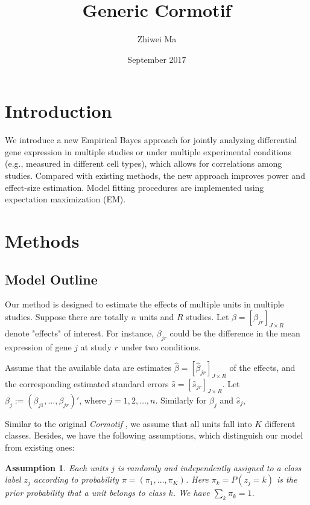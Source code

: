 \documentclass[11pt]{article}
\title{Generic Cormotif}
\author{Zhiwei Ma}
\date{September 2017}
\newtheorem{assumption}{Assumption}
\begin{document}
\maketitle

\section{Introduction}

We introduce a new Empirical Bayes approach for jointly analyzing differential gene expression in multiple studies or under multiple experimental conditions (e.g., measured in different cell types), which allows for correlations among studies. Compared with existing methods, the new approach improves power and effect-size estimation. Model fitting procedures are implemented using expectation maximization (EM).
\section{Methods}

\subsection{Model Outline}

Our method is designed to estimate the effects of multiple units in multiple studies. Suppose there are totally $n$ units and $R$ studies. Let $\beta = [\beta_{jr}]_{J\times R}$ denote "effects" of interest. For instance, $\beta_{jr}$ could be the difference in the mean expression of gene $j$ at study $r$ under two conditions. 

Assume that the available data are estimates $\hat \beta = [\hat \beta_{jr}]_{J\times R}$ of the effects, and the corresponding estimated standard errors $\hat s = [\hat s_{jr}]_{J\times R}$. Let $\beta_j:=(\beta_{j1},\ldots,\beta_{jr})'$, where $j=1,2,\ldots,n$. Similarly for $\hat \beta_j$ and $\hat s_j$,

Similar to the original \textit{Cormotif} \cite{cormotif}, we assume that all units fall into $K$ different classes. Besides, we have the following assumptions, which distinguish our model from existing ones:

\begin{assumption}Each units $j$ is randomly and independently assigned to a class label $z_j$ according to probability $\pi=(\pi_1,\ldots,\pi_K)$. Here $\pi_k=P(z_j=k)$ is the prior probability that a unit belongs to class $k$. We have $\sum_k\pi_k = 1$.
\end{assumption}
 
\end{document}
